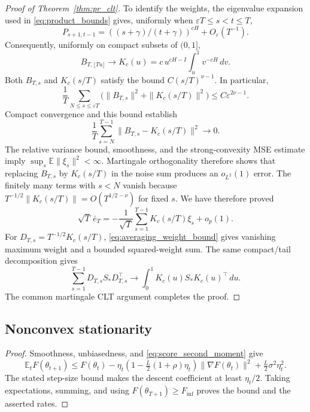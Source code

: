\begin{proof}[Proof of Theorem~\ref{thm:pr_clt}]
To identify the weights, the eigenvalue expansion used in
\eqref{eq:product_bounds} gives, uniformly when
$\varepsilon T\le s<t\le T$,
\[
P_{s+1,t-1}=((s+\gamma)/(t+\gamma))^{cH}+O_\varepsilon(T^{-1}).
\]
Consequently, uniformly on compact subsets of $(0,1]$,
\[
B_{T,\lfloor Tu\rfloor}\longrightarrow
K_c(u)=c\,u^{cH-I}\int_u^1v^{-cH}\,dv.
\]
Both $B_{T,s}$ and $K_c(s/T)$ satisfy the bound
$C(s/T)^{\nu-1}$. In particular,
\[
\frac1T\sum_{N\le s\le\varepsilon T}
\bigl(\|B_{T,s}\|^2+\|K_c(s/T)\|^2\bigr)
\le C\varepsilon^{2\nu-1}.
\]
Compact convergence and this bound establish
\begin{equation}\label{eq:kernel_l2}
\frac1T\sum_{s=N}^{T-1}\|B_{T,s}-K_c(s/T)\|^2\longrightarrow0.
\end{equation}
The relative variance bound, smoothness, and the strong-convexity MSE
estimate imply $\sup_s\mathbb E\|\xi_s\|^2<\infty$.
Martingale orthogonality therefore shows that
replacing $B_{T,s}$ by $K_c(s/T)$ in the noise sum produces an
$o_{L^2}(1)$ error. The finitely many terms with $s<N$ vanish because
$T^{-1/2}\|K_c(s/T)\|=O(T^{1/2-\nu})$ for fixed $s$.
We have therefore proved
\[
\sqrt T\,\bar e_T=-\frac1{\sqrt T}\sum_{s=1}^{T-1}K_c(s/T)\xi_s+o_p(1).
\]
For $D_{T,s}=T^{-1/2}K_c(s/T)$,
\eqref{eq:averaging_weight_bound} gives vanishing maximum weight and a
bounded squared-weight sum. The same compact/tail decomposition gives
\[
\sum_{s=1}^{T-1}D_{T,s}S_*D_{T,s}^\top
\longrightarrow\int_0^1K_c(u)S_*K_c(u)^\top\,du.
\]
The common martingale CLT argument completes the proof.
\end{proof}

\subsection{Nonconvex stationarity}
\begin{proof}
Smoothness, unbiasedness, and \eqref{eq:score_second_moment} give
\[
\mathbb E_tF(\theta_{t+1})
\le F(\theta_t)-\eta_t\left(1-\tfrac L2(1+\rho)\eta_t\right)
\|\nabla F(\theta_t)\|^2+\tfrac L2\sigma^2\eta_t^2.
\]
The stated step-size bound makes the descent coefficient at least
$\eta_t/2$. Taking expectations, summing, and using
$F(\theta_{T+1})\ge F_{\inf}$ proves the bound and the asserted rates.
\end{proof}


